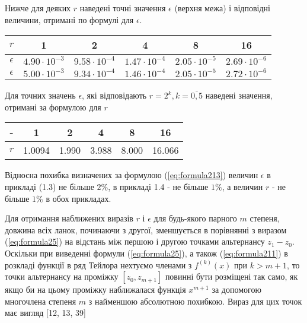 \documentclass[ukrainian,14pt]{extarticle}
\begin{document}
    Нижче для деяких $r$ наведені точні значення $\epsilon$ (верхня межа) і відповідні величини, отримані по формулі для $\epsilon$.
    
\bgroup
\def\arraystretch{1.5}
\begin{center}
\begin{tabular}{ c | c |
c | c | c | c}
 $r$ & 1 & 2 & 4 & 8 & 16 \\
 \hline
 $\epsilon$ & $4.90 \cdot 10^{-3}$ & $9.58 \cdot 10^{-4}$ & $1.47 \cdot 10^{-4}$ & $2.05 \cdot 10^{-5}$ & $2.69 \cdot 10^{-6}$ \\  
 \hline
 $\epsilon$ & $5.00 \cdot 10^{-3}$ & $9.34 \cdot 10^{-4}$ & $1.46 \cdot 10^{-4}$ & $2.05 \cdot 10^{-5}$ & $2.72 \cdot 10^{-6}$ \\  

\end{tabular}
\end{center}
\egroup

Для точних значень $\epsilon$, які відповідають $r = 2^k, k = \overline{0, 5}$ наведені значення, отримані за формулою для $r$

\bgroup
\def\arraystretch{1.5}
\begin{center}
\begin{tabular}{ c | c |
c | c | c | c}
 - & 1 & 2 & 4 & 8 & 16 \\
 \hline
 $r$ & 1.0094 & 1.990 & 3.988 & 8.000 & 16.066 \\  

\end{tabular}
\end{center}
\egroup

Відносна похибка визначених за формулою (\ref{eq:formula213}) величин $\epsilon$ в прикладі (1.3) не більше $2\%$, в прикладі 1.4 - не більше $1\%$, а величин $r$ - не більше $1\%$ в обох прикладах.

Для отримання наближених виразів $r$ і $\epsilon$ для будь-якого парного $m$ степеня, довжина всіх ланок, починаючи з другої, зменшується в порівнянні з виразом (\ref{eq:formula25}) на відстань між першою і другою точками альтернансу $z_1 - z_0$. Оскільки при виведенні формули (\ref{eq:formula25}), а також (\ref{eq:formula211}) в розкладі функції в ряд Тейлора нехтуємо членами з $f^{(k)}(x)$ при $k > m + 1$, то точки альтернансу на проміжку $[z_0, z_{m+1}]$ повинні бути розміщені так само, як якщо би на цьому проміжку наближалася функція $x^{m+1}$ за допомогою многочлена степеня $m$ з найменшою абсолютною похибкою. Вираз для цих точок має вигляд [12, 13, 39]
\end{document}
